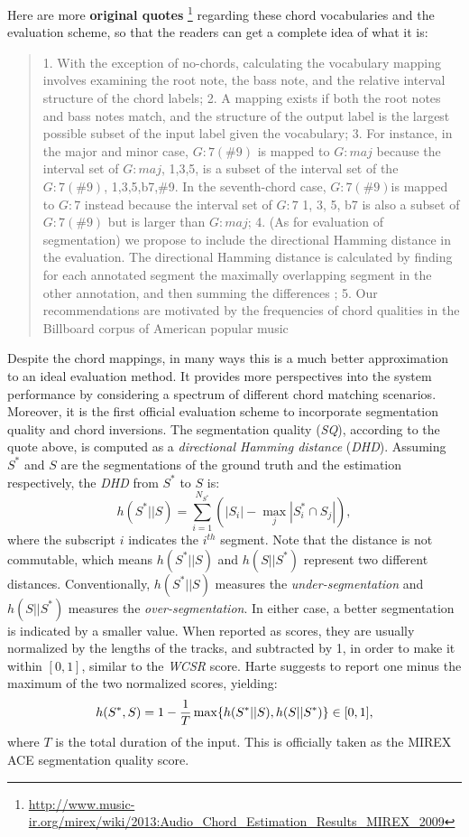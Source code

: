 Here are more \textbf{original quotes} \footnote{\url{http://www.music-ir.org/mirex/wiki/2013:Audio\_Chord\_Estimation\_Results\_MIREX\_2009}} regarding these chord vocabularies and the evaluation scheme, so that the readers can get a complete idea of what it is:
\begin{quote}
1. With the exception of no-chords, calculating the vocabulary mapping involves examining the root note, the bass note, and the relative interval structure of the chord labels; 2. A mapping exists if both the root notes and bass notes match, and the structure of the output label is the largest possible subset of the input label given the vocabulary; 3. For instance, in the major and minor case, $G:7(\#9)$ is mapped to $G:maj$ because the interval set of $G:maj$, {1,3,5}, is a subset of the interval set of the $G:7(\#9)$, {1,3,5,b7,\#9}. In the seventh-chord case, $G:7(\#9)$is mapped to $G:7$ instead because the interval set of $G:7$ {1, 3, 5, b7} is also a subset of $G:7(\#9)$ but is larger than $G:maj$; 4. (As for evaluation of segmentation) we propose to include the directional Hamming distance in the evaluation. The directional Hamming distance is calculated by finding for each annotated segment the maximally overlapping segment in the other annotation, and then summing the differences \cite{abdallah2005theory,mauch2010automatic}; 5. Our recommendations are motivated by the frequencies of chord qualities in the Billboard corpus of American popular music \cite{burgoyne2011expert}
\end{quote}
Despite the chord mappings, in many ways this is a much better approximation to an ideal evaluation method. It provides more perspectives into the system performance by considering a spectrum of different chord matching scenarios. Moreover, it is the first official evaluation scheme to incorporate segmentation quality and chord inversions. The segmentation quality (\textit{SQ}), according to the quote above, is computed as a {\it directional Hamming distance} (\textit{DHD}). Assuming $S^*$ and $S$ are the segmentations of the ground truth and the estimation respectively, the \textit{DHD} from $S^*$ to $S$ is:
\begin{equation}
h(S^*||S) = \sum_{i=1}^{N_{S^*}}(|S_i|-\max_j|S_i^* \cap S_j|),
\end{equation}
where the subscript $i$ indicates the $i^{th}$ segment. Note that the distance is not commutable, which means $h(S^*||S)$ and $h(S||S^*)$ represent two different distances. Conventionally, $h(S^*||S)$ measures the {\it under-segmentation} and $h(S||S^*)$ measures the {\it over-segmentation}. In either case, a better segmentation is indicated by a smaller value. When reported as scores, they are usually normalized by the lengths of the tracks, and subtracted by 1, in order to make it within $[0,1]$, similar to the \textit{WCSR} score. Harte \cite{harte2010towards} suggests to report one minus the maximum of the two normalized scores, yielding:
\begin{equation}
h(S^*,S)=1-{1\over T}\max\{h(S^*||S), h(S||S^*)\} \in [0,1],
\end{equation}
where $T$ is the total duration of the input. This is officially taken as the MIREX ACE segmentation quality score.


